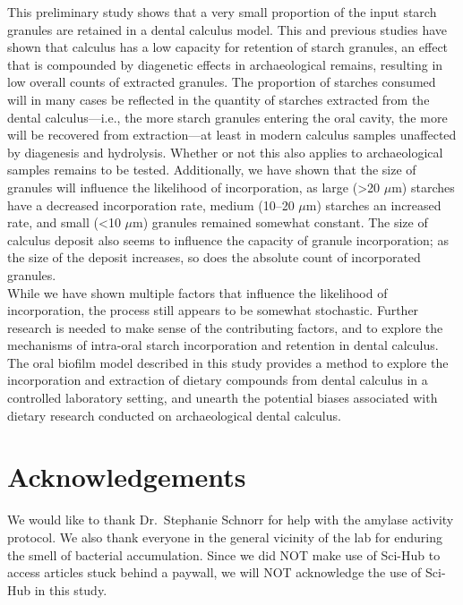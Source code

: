 \documentclass[
]{article}
\begin{document}
This preliminary study shows that a very small proportion of the input starch
granules are retained in a dental calculus model. This and previous studies
have shown that calculus has a low capacity for retention of starch granules,
an effect that is compounded by diagenetic effects in archaeological remains,
resulting in low overall counts of extracted granules.
The proportion of starches consumed will in many cases be reflected
in the quantity
of starches extracted from the dental calculus---i.e., the more starch granules
entering the oral cavity, the more will be recovered from extraction---at
least in modern calculus samples unaffected by diagenesis and hydrolysis.
Whether or not this also applies to archaeological samples remains to be tested.
Additionally, we have
shown that the size of granules will influence the likelihood of incorporation,
as large (\textgreater20 \(\mu\)m) starches have a decreased incorporation rate, medium
(10--20 \(\mu\)m)
starches an increased rate, and small (\textless10 \(\mu\)m) granules remained somewhat
constant. The size of calculus deposit also seems to influence the capacity of
granule incorporation; as the size of the deposit increases, so does the
absolute count of incorporated granules.\\
While we have shown multiple factors that influence the likelihood
of incorporation, the process still appears to be somewhat stochastic. Further
research is needed to make sense of the contributing factors, and to explore the
mechanisms of intra-oral starch incorporation and retention in dental calculus.
The oral biofilm model described in this study provides a method
to explore the incorporation and extraction of dietary compounds from dental calculus
in a controlled laboratory setting, and unearth the potential biases associated
with dietary research conducted on archaeological dental calculus.

\hypertarget{acknowledgements}{%
\section*{Acknowledgements}\label{acknowledgements}}

We would like to thank Dr.~Stephanie Schnorr for help with the amylase activity protocol.
We also thank everyone in the general vicinity
of the lab for enduring the smell of bacterial accumulation.
Since we did NOT make use of Sci-Hub to access articles stuck behind a paywall,
we will NOT acknowledge the use of Sci-Hub in this study.
\end{document}
